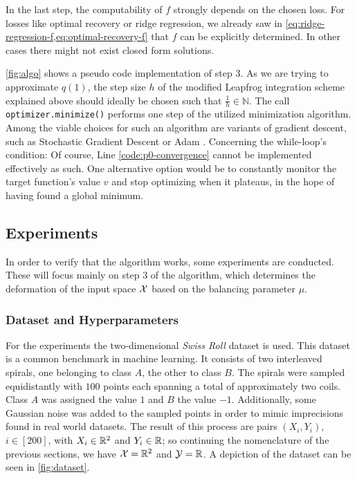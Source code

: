 In the last step, the computability of $f$ strongly depends on the chosen loss.
For losses like optimal recovery or ridge regression, we already saw in \cref{eq:ridge-regression-f,eq:optimal-recovery-f} that $f$ can be explicitly determined.
In other cases there might not exist closed form solutions.



\cref{fig:algo} shows a pseudo code implementation of step 3.
As we are trying to approximate $q(1)$, the step size $h$ of the modified Leapfrog integration scheme explained above should ideally be chosen such that $\frac{1}{h} \in \mathbb{N}$.
The call \texttt{optimizer.minimize()} performs one step of the utilized minimization algorithm.
Among the viable choices for such an algorithm are variants of gradient descent, such as Stochastic Gradient Descent or Adam \cite{kingma17}.
Concerning the while-loop's condition: Of course, Line \ref{code:p0-convergence} cannot be implemented effectively as such.
One alternative option would be to constantly monitor the target function's value $v$ and stop optimizing when it plateaus, in the hope of having found a global minimum.

\subsection{Experiments}

In order to verify that the algorithm works, some experiments are conducted.
These will focus mainly on step 3 of the algorithm, which determines the deformation of the input space $\mathcal{X}$ based on the balancing parameter $\mu$.

\subsubsection{Dataset and Hyperparameters}

For the experiments the two-dimensional \emph{Swiss Roll} dataset is used.
This dataset is a common benchmark in machine learning.
It consists of two interleaved spirals, one belonging to class $A$, the other to class $B$.
The spirals were sampled equidistantly with $100$ points each spanning a total of approximately two coils.
Class $A$ was assigned the value $1$ and $B$ the value $-1$.
Additionally, some Gaussian noise was added to the sampled points in order to mimic imprecisions found in real world datasets.
The result of this process are pairs $(X_i, Y_i)$, $i \in [200]$, with $X_i \in \mathbb{R}^2$ and $Y_i \in \mathbb{R}$; so continuing the nomenclature of the previous sections, we have $\mathcal{X} = \mathbb{R}^2$ and $\mathcal{Y} = \mathbb{R}$.
A depiction of the dataset can be seen in \cref{fig:dataset}. 



